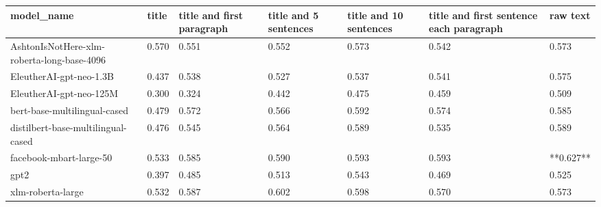 \begin{tabular}{lllllll}
\toprule
                                model\_name & title & title and first paragraph & title and 5 sentences & title and 10 sentences & title and first sentence each paragraph &  raw text \\
\midrule
AshtonIsNotHere-xlm-roberta-long-base-4096 & 0.570 &                     0.551 &                 0.552 &                  0.573 &                                   0.542 &     0.573 \\
                   EleutherAI-gpt-neo-1.3B & 0.437 &                     0.538 &                 0.527 &                  0.537 &                                   0.541 &     0.575 \\
                   EleutherAI-gpt-neo-125M & 0.300 &                     0.324 &                 0.442 &                  0.475 &                                   0.459 &     0.509 \\
              bert-base-multilingual-cased & 0.479 &                     0.572 &                 0.566 &                  0.592 &                                   0.574 &     0.585 \\
        distilbert-base-multilingual-cased & 0.476 &                     0.545 &                 0.564 &                  0.589 &                                   0.535 &     0.589 \\
                   facebook-mbart-large-50 & 0.533 &                     0.585 &                 0.590 &                  0.593 &                                   0.593 & **0.627** \\
                                      gpt2 & 0.397 &                     0.485 &                 0.513 &                  0.543 &                                   0.469 &     0.525 \\
                         xlm-roberta-large & 0.532 &                     0.587 &                 0.602 &                  0.598 &                                   0.570 &     0.573 \\
\bottomrule
\end{tabular}
